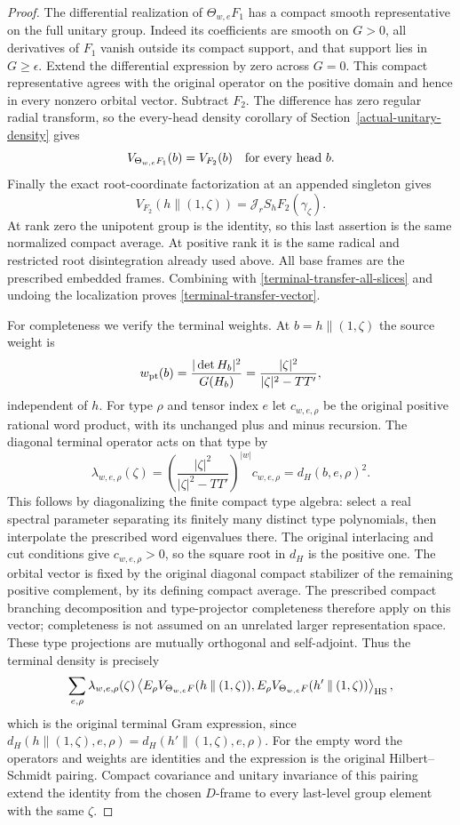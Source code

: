\begin{proof}
The differential realization of $\Theta_{w,e}F_1$ has a
compact smooth representative on the full unitary group.
Indeed its coefficients are smooth on $G>0$, all derivatives
of $F_1$ vanish outside its compact support, and that support
lies in $G\ge\epsilon$.  Extend the differential expression
by zero across $G=0$.  This compact representative agrees
with the original operator on the positive domain and
hence in every nonzero orbital vector.  Subtract $F_2$.
The difference has zero regular radial transform, so the
every-head density corollary of
Section~\ref{actual-unitary-density} gives
\[
             V_{\Theta_{w,e}F_1}(b)=V_{F_2}(b)
                                  \quad\hbox{for every head }b.
\]
Finally the exact root-coordinate factorization at an
appended singleton gives
\[
      V_{F_2}(h\mathbin{\|}(1,\zeta))
            =\mathcal J_rS_hF_2(\gamma_\zeta).
\]
At rank zero the unipotent group is the identity, so this
last assertion is the same normalized compact average.
At positive rank it is the same radical and restricted
root disintegration already used above.  All base frames
are the prescribed embedded frames.  Combining with
\eqref{terminal-transfer-all-slices} and undoing the
localization proves \eqref{terminal-transfer-vector}.

For completeness we verify the terminal weights.  At
$b=h\mathbin{\|}(1,\zeta)$ the source weight is
\[
 w_{\rm pt}(b)=\frac{|\det H_b|^2}{G(H_b)}
                  =\frac{|\zeta|^2}{|\zeta|^2-TT'},
\]
independent of $h$.  For type $\rho$ and tensor index $e$
let $c_{w,e,\rho}$ be the original positive rational word
product, with its unchanged plus and minus recursion.
The diagonal terminal operator acts on that type by
\[
       \lambda_{w,e,\rho}(\zeta)
         =\left(\frac{|\zeta|^2}{|\zeta|^2-TT'}\right)^{|w|}
                    c_{w,e,\rho}=d_H(b,e,\rho)^2.
\]
This follows by diagonalizing the finite compact type
algebra: select a real spectral parameter separating its
finitely many distinct type polynomials, then interpolate
the prescribed word eigenvalues there.  The original
interlacing and cut conditions give
$c_{w,e,\rho}>0$, so the square root in $d_H$ is the
positive one.  The orbital vector is fixed by the original
diagonal compact stabilizer of the remaining positive
complement, by its defining compact average.  The prescribed
compact branching decomposition and type-projector
completeness therefore apply on this vector; completeness
is not assumed on an unrelated larger representation space.
These type projections are mutually orthogonal and
self-adjoint.  Thus
the terminal density is precisely
\[
 \sum_{e,\rho}\lambda_{w,e,\rho}(\zeta)
   \left\langle E_\rho V_{\Theta_{w,e}F}(h\mathbin{\|}(1,\zeta)),
       E_\rho V_{\Theta_{w,e}F}(h'\mathbin{\|}(1,\zeta))
   \right\rangle_{\rm HS},
\]
which is the original terminal Gram expression, since
$d_H(h\mathbin{\|}(1,\zeta),e,\rho)
 =d_H(h'\mathbin{\|}(1,\zeta),e,\rho)$.
For the empty word the operators and weights are identities
and the expression is the original Hilbert--Schmidt pairing.
Compact covariance and unitary invariance of this pairing
extend the identity from the chosen $D$-frame to every
last-level group element with the same $\zeta$.
\end{proof}

